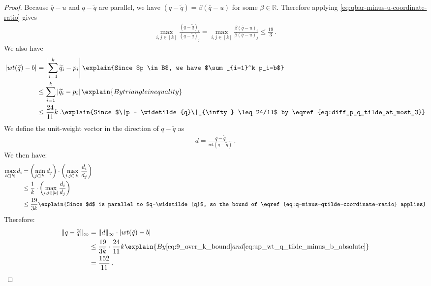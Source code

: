 \documentclass[11pt]{article}
\begin{document}
\begin{proof}
    Because $\overline{q}-u$ and $q - \widetilde{q}$ are parallel, we have $(q-\widetilde{q}) = \beta (\overline{q}-u)$ for some $\beta \in \mathbb{R}$. Therefore applying \eqref{eq:qbar-minus-u-coordinate-ratio} gives 
    \begin{align}\label{eq:q-minus-qtilde-coordinate-ratio}
        \max_{i, j \in [k]} \frac{(q-\widetilde{q})_i}{(q-\widetilde{q})_j} = \max_{i, j \in [k]} \frac{\beta (\overline{q}-u)_i}{\beta (\overline{q}-u)_j} \leq \frac{19}{3} \,.
    \end{align}
    We also have 
    \begin{align}
    |wt(\widetilde{q}) - b| &= \left| \sum_{i=1}^k \widetilde{q}_i - p_i \right| \explain{Since $p \in B$, we have $\sum_{i=1}^k p_i=b$} \\
    &\leq \sum_{i=1}^k \left| \widetilde{q}_i - p_i\right| \explain{By triangle inequality} \\
    &\leq \frac{24}{11}k\,. \explain{Since $\|p - \widetilde{q}\|_{\infty} \leq 24/11$ by \eqref{eq:diff_p_q_tilde_at_most_3}}  \\
    \label{eq:up_wt_q_tilde_minus_b_absolute}
    \end{align}
    We define the unit-weight vector in the direction of $q-\widetilde{q}$ as
    \begin{align} d = \frac{q-\widetilde{q}}{wt(q-\widetilde{q})} \,.
    \end{align}
    We then have:
    \begin{align}
        \max_{i \in [k]} d_i &= \left(\min_{j \in [k]} d_j\right) \cdot \left(\max_{i, j \in [k]} \frac{d_i}{d_j}\right) \\
        &\leq \frac{1}{k} \cdot \left(\max_{i, j \in [k]} \frac{d_i}{d_j}\right) \\
        &\leq \frac{19}{3k} \explain{Since $d$ is parallel to $q-\widetilde{q}$, so the bound of \eqref{eq:q-minus-qtilde-coordinate-ratio} applies}\\
        \label{eq:9_over_k_bound}
    \end{align}
    Therefore:
    \begin{align}
        \|q - \widetilde{q}\|_{\infty} &= \|d\|_{\infty} \cdot |wt(\tilde{q}) - b| \\
        &\leq \frac{19}{3k} \cdot \frac{24}{11}k \explain{By \eqref{eq:9_over_k_bound} and \eqref{eq:up_wt_q_tilde_minus_b_absolute}}\\
        &= \frac{152}{11}  \,. \label{eq:q_minus_q_tilde_norm_ub}
    \end{align}


\end{proof}
\end{document}
